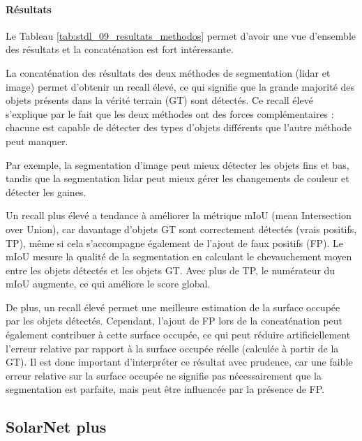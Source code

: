 \paragraph{Résultats}

\par{Le Tableau \ref{tab:stdl_09_resultats_methodos} permet d'avoir une vue d'ensemble des résultats et la concaténation est fort intéressante.}

\par{La concaténation des résultats des deux méthodes de segmentation (\gls{lidar} et image) permet d'obtenir un recall élevé, ce qui signifie que la grande majorité des objets présents dans la vérité terrain (GT) sont détectés. Ce recall élevé s'explique par le fait que les deux méthodes ont des forces complémentaires : chacune est capable de détecter des types d'objets différents que l'autre méthode peut manquer.}

\par{Par exemple, la segmentation d'image peut mieux détecter les objets fins et bas, tandis que la segmentation \gls{lidar} peut mieux gérer les changements de couleur et détecter les gaines.}

\par{Un recall plus élevé a tendance à améliorer la métrique mIoU (mean Intersection over Union), car davantage d'objets GT sont correctement détectés (vrais positifs, TP), même si cela s'accompagne également de l'ajout de faux positifs (FP). Le mIoU mesure la qualité de la segmentation en calculant le chevauchement moyen entre les objets détectés et les objets GT. Avec plus de TP, le numérateur du mIoU augmente, ce qui améliore le score global.}

\par{De plus, un recall élevé permet une meilleure estimation de la surface occupée par les objets détectés. Cependant, l'ajout de FP lors de la concaténation peut également contribuer à cette surface occupée, ce qui peut réduire artificiellement l'erreur relative par rapport à la surface occupée réelle (calculée à partir de la GT). Il est donc important d'interpréter ce résultat avec prudence, car une faible erreur relative sur la surface occupée ne signifie pas nécessairement que la segmentation est parfaite, mais peut être influencée par la présence de FP.}

\subsection{SolarNet plus}
\label{subsec:solar_net_plus}

